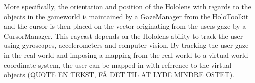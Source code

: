 More specifically, the orientation and position of the Hololens with regards to the objects in the gameworld is maintained by a GazeManager from the HoloToolkit and the cursor is then placed on the vector originating from the users gaze by a CursorManager. This raycast depends on the Hololens ability to track the user using gyroscopes, accelerometers and computer vision. By tracking the user gaze in the real world and imposing a mapping from the real-world to a virtual-world coordinate system, the user can be mapped in with reference to the virtual objects (QUOTE EN TEKST, FÅ DET TIL AT LYDE MINDRE OSTET). 